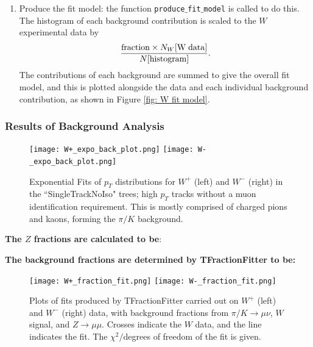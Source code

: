 \documentclass[a4paper]{article}
\begin{document}
\begin{enumerate}
    \item Produce the fit model: the function \texttt{produce$\_$fit$\_$model} is called to do this. The histogram of each background contribution is scaled to the $W$ experimental data by
    \begin{equation}
        \frac{{\rm fraction} \times N_W[{\rm W \; data}]}{N[{\rm histogram}]}.
    \end{equation}
    The contributions of each background are summed to give the overall fit model, and this is plotted alongside the data and each individual background contribution, as shown in Figure \ref{fig: W fit model}.
\end{enumerate}




\subsubsection{Results of Background Analysis} \label{sec: W background results}

\begin{figure}[h]
  \centering
  \texttt{[image: W+\_expo\_back\_plot.png]}
  \texttt{[image: W-\_expo\_back\_plot.png]} \hspace{3mm}
  \vspace{-4mm}
  \caption{\small Exponential Fits of $p_T$ distributions for $W^+$ (left) and $W^-$ (right) in the ``SingleTrackNoIso" trees; high $p_T$ tracks without a muon identification requirement. This is mostly comprised of charged pions and kaons, forming the $\pi/K$ background.}
  \label{fig: W exp back fit}
\end{figure}



\textbf{The $Z$ fractions are calculated to be}: \newline



\textbf{The background fractions are determined by TFractionFitter to be:} \newline

\newline


\begin{figure}[h]
\centering
\texttt{[image: W+\_fraction\_fit.png]}
\texttt{[image: W-\_fraction\_fit.png]} 
\vspace{-4mm}
\caption{\small Plots of fits produced by TFractionFitter carried out on $W^+$ (left) and $W^-$ (right) data, with background fractions from $\pi/K \xrightarrow{} \mu\nu$, $W$ signal, and $Z \xrightarrow{} \mu\mu$. Crosses indicate the $W$ data, and the line indicates the fit. The $\chi^2/$degrees of freedom of the fit is given.}
\label{fig: W fraction fit}
\end{figure}
\end{document}
